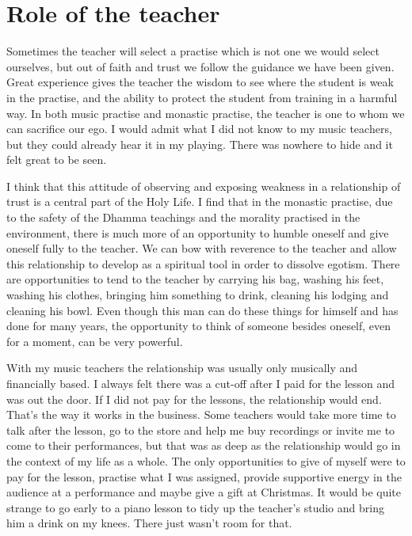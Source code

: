 \section{Role of the teacher}

Sometimes the teacher will select a practise which is not one we would
select ourselves, but out of faith and trust we follow the guidance we
have been given. Great experience gives the teacher the wisdom to see
where the student is weak in the practise, and the ability to protect
the student from training in a harmful way. In both music practise and
monastic practise, the teacher is one to whom we can sacrifice our ego. 
I would admit what I did not know to my music teachers, but they could
already hear it in my playing. There was nowhere to hide and it felt
great to be seen. 

I think that this attitude of observing and exposing weakness in a
relationship of trust is a central part of the Holy Life. I find that in
the monastic practise, due to the safety of the Dhamma teachings and the
morality practised in the environment, there is much more of an
opportunity to humble oneself and give oneself fully to the teacher. We
can bow with reverence to the teacher and allow this relationship to
develop as a spiritual tool in order to dissolve egotism. There are
opportunities to tend to the teacher by carrying his bag, washing his
feet, washing his clothes, bringing him something to drink, cleaning his
lodging and cleaning his bowl. Even though this man can do these things
for himself and has done for many years, the opportunity to think of
someone besides oneself, even for a moment, can be very powerful. 

With my music teachers the relationship was usually only musically and
financially based. I always felt there was a cut-off after I paid for
the lesson and was out the door. If I did not pay for the lessons, the
relationship would end. That's the way it works in the business. Some
teachers would take more time to talk after the lesson, go to the store
and help me buy recordings or invite me to come to their performances, 
but that was as deep as the relationship would go in the context of my
life as a whole. The only opportunities to give of myself were to pay
for the lesson, practise what I was assigned, provide supportive energy
in the audience at a performance and maybe give a gift at Christmas. It
would be quite strange to go early to a piano lesson to tidy up the
teacher's studio and bring him a drink on my knees. There just wasn't
room for that. 

